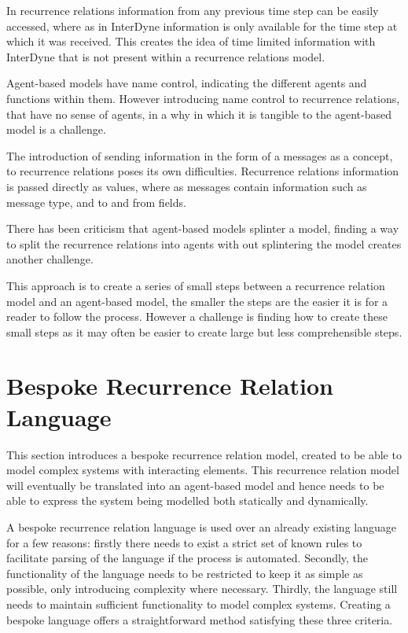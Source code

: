 \documentclass{article}
\begin{document}
In recurrence relations information from any previous time step can be easily accessed, where as in InterDyne information is only available for the time step at which it was received. This creates the idea of time limited information with InterDyne that is not present within a recurrence relations model.   

Agent-based models have name control, indicating the different agents and functions within them. However introducing name control to  recurrence relations, that have no sense of agents, in a why in which it is tangible to the agent-based model is a challenge. 

The introduction of sending information in the form of a messages as a concept, to recurrence relations poses its own difficulties. Recurrence relations information is passed directly as values, where as messages contain information such as message type, and to and from fields. 

There has been criticism that agent-based models splinter a model, finding a way to split the recurrence relations into agents with out splintering the model creates another challenge. 

This approach is to create a series of small steps between a recurrence relation model and an agent-based model, the smaller the steps are the easier it is for a reader to follow the process. However a challenge is finding how to create these small steps as it may often be easier to create large but less comprehensible steps.   









\section{Bespoke Recurrence Relation Language} \label{beskoperecurrancerealtion}
This section introduces a bespoke recurrence relation model, created to be able to model complex systems with interacting elements. This recurrence relation model will eventually be translated into an agent-based model and hence needs to be able to express the system being modelled both statically and dynamically. 

A bespoke recurrence relation language is used over an already existing language for a few reasons: firstly there needs to exist a strict set of known rules to facilitate parsing of the language if the process is automated. Secondly, the functionality of the language needs to be restricted to keep it as simple as possible, only introducing complexity where necessary. Thirdly, the language still needs to maintain sufficient functionality to model complex systems. Creating a bespoke language offers a straightforward method satisfying these three criteria.     
 
\end{document}
